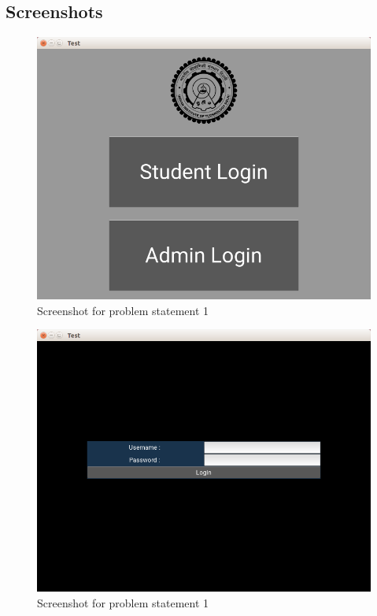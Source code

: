 \documentclass[11pt]{report}
\begin{document}
	\subsection{Screenshots}
	\begin{figure}[h!]
	\centering
	\includegraphics[scale=0.8, center]{images/screenshot1}
	\caption{Screenshot for problem statement 1}
	\end{figure}
	\begin{figure}[h!]
	\centering
	\includegraphics[scale=0.8, center]{images/screenshot2}
	\caption{Screenshot for problem statement 1}
	\end{figure}
\end{document}

